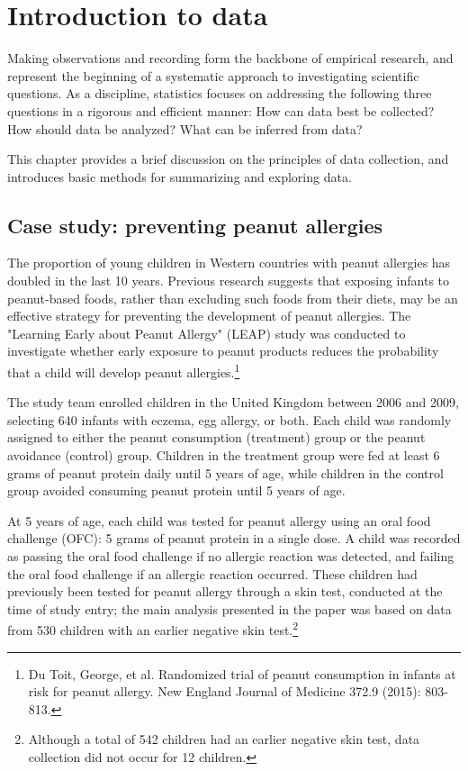 

\chapter{Introduction to data}
\label{introductionToData}

Making observations and recording  form the backbone of empirical research, and represent the beginning of a systematic approach to investigating scientific questions. As a discipline, statistics focuses on addressing the following three questions in a rigorous and efficient manner: How can data best be collected? How should data be analyzed? What can be inferred from data?

This chapter provides a brief discussion on the principles of data collection, and introduces basic methods for summarizing and exploring data. 


\section[Case study]{Case study: preventing peanut allergies}
\label{leapCaseStudy}


The proportion of young children in Western countries with peanut allergies has doubled in the last 10 years. Previous research suggests that exposing infants to peanut-based foods, rather than excluding such foods from their diets, may be an effective strategy for preventing the development of peanut allergies. The "Learning Early about Peanut Allergy" (LEAP) study was conducted to investigate whether early exposure to peanut products reduces the probability that a child will develop peanut allergies.\footnote{Du Toit, George, et al. Randomized trial of peanut consumption in infants at risk for peanut allergy. New England Journal of Medicine 372.9 (2015): 803-813.}

The study team enrolled children in the United Kingdom between 2006 and 2009, selecting 640 infants with eczema, egg allergy, or both. Each child was randomly assigned to either the peanut consumption (treatment) group or the peanut avoidance (control) group. Children in the treatment group were fed at least 6 grams of peanut protein daily until 5 years of age, while children in the control group avoided consuming peanut protein until 5 years of age.

At 5 years of age, each child was tested for peanut allergy using an oral food challenge (OFC): 5 grams of peanut protein in a single dose. A child was recorded as passing the oral food challenge if no allergic reaction was detected, and failing the oral food challenge if an allergic reaction occurred. These children had previously been tested for peanut allergy through a skin test, conducted at the time of study entry; the main analysis presented in the paper was based on data from 530 children with an earlier negative skin test.\footnote{Although a total of 542 children had an earlier negative skin test, data collection did not occur for 12 children.} 

